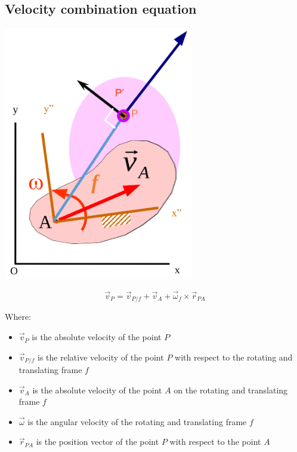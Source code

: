 \documentclass[11pt]{article}
\begin{document}
\subsection{Velocity combination equation}
\label{sec:org58b2895}
\begin{center}
\includegraphics[height=30em]{./images/velocity-combination-equation-diagram.png}
\end{center}

\[\vec{v}_P = \vec{v}_{P/f} + \vec{v}_A + \vec{\omega}_f \times \vec{r}_{PA}\]

Where:
\begin{itemize}
\item \(\vec{v}_P\) is the absolute velocity of the point \(P\)
\item \(\vec{v}_{P/f}\) is the relative velocity of the point \(P\) with respect to the rotating and translating frame \(f\)
\item \(\vec{v}_A\) is the absolute velocity of the point \(A\) on the rotating and translating frame \(f\)
\item \(\vec{\omega}\) is the angular velocity of the rotating and translating frame \(f\)
\item \(\vec{r}_{PA}\) is the position vector of the point \(P\) with respect to the point \(A\)
\end{itemize}
\end{document}
